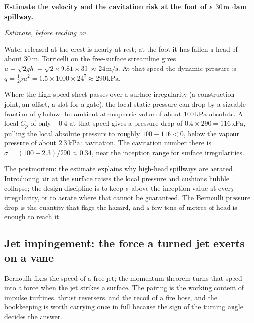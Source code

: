 \begin{estimation}
\textbf{Estimate the velocity and the cavitation risk at the foot of
a $30\,\si{\meter}$ dam spillway.}

\smallskip
\textit{Estimate, before reading on.}

\smallskip
Water released at the crest is nearly at rest; at the foot it has
fallen a head of about $30\,\si{\meter}$. Torricelli on the
free-surface streamline gives $u = \sqrt{2gh} = \sqrt{2\times 9.81
\times 30} \approx 24\,\si{\meter\per\second}$. At that speed the
dynamic pressure is $q = \tfrac12\rho u^2 = 0.5\times 1000\times 24^2
\approx 290\,\text{kPa}$.

Where the high-speed sheet passes over a surface irregularity (a
construction joint, an offset, a slot for a gate), the local static
pressure can drop by a sizeable fraction of $q$ below the ambient
atmospheric value of about $100\,\text{kPa}$ absolute. A local
$C_p$ of only $-0.4$ at that speed gives a pressure drop of
$0.4\times 290 = 116\,\text{kPa}$, pulling the local absolute pressure
to roughly $100 - 116 < 0$, below the vapour pressure of about
$2.3\,\text{kPa}$: cavitation. The cavitation number there is
$\sigma = (100 - 2.3)/290 \approx 0.34$, near the inception range for
surface irregularities.

\smallskip
The postmortem: the estimate explains why high-head spillways are
aerated. Introducing air at the surface raises the local pressure and
cushions bubble collapse; the design discipline is to keep $\sigma$
above the inception value at every irregularity, or to aerate where
that cannot be guaranteed. The Bernoulli pressure drop is the
quantity that flags the hazard, and a few tens of metres of head is
enough to reach it.
\end{estimation}

\subsection{Jet impingement: the force a turned jet exerts on a vane}

Bernoulli fixes the speed of a free jet; the momentum theorem turns
that speed into a force when the jet strikes a surface. The pairing is
the working content of impulse turbines, thrust reversers, and the
recoil of a fire hose, and the bookkeeping is worth carrying once in
full because the sign of the turning angle decides the answer.



